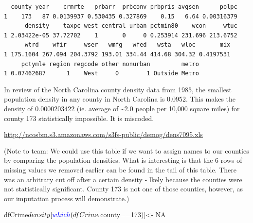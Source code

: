 \documentclass[]{article}
\newenvironment{Shaded}{}{}
\newcommand{\DecValTok}[1]{#1}
\newcommand{\KeywordTok}[1]{\textcolor[rgb]{0.00,0.00,1.00}{#1}}
\newcommand{\NormalTok}[1]{#1}
\newcommand{\OperatorTok}[1]{#1}
\newcommand{\OtherTok}[1]{\textcolor[rgb]{1.00,0.25,0.00}{#1}}
\newcommand{\StringTok}[1]{\textcolor[rgb]{0.00,0.50,0.50}{#1}}
\begin{document}
\begin{verbatim}
  county year    crmrte   prbarr  prbconv prbpris avgsen      polpc
1    173   87 0.0139937 0.530435 0.327869    0.15   6.64 0.00316379
      density    taxpc west central urban pctmin80    wcon     wtuc
1 2.03422e-05 37.72702    1       0     0 0.253914 231.696 213.6752
      wtrd    wfir     wser   wmfg   wfed   wsta   wloc       mix
1 175.1604 267.094 204.3792 193.01 334.44 414.68 304.32 0.4197531
     pctymle region regcode other nonurban         metro
1 0.07462687      1    West     0        1 Outside Metro
\end{verbatim}

In review of the North Carolina county density data from 1985, the
smallest population density in any county in North Carolina is 0.0952.
This makes the density of 0.0000203422 (ie. average of
\textasciitilde{}2.0 people per 10,000 square miles) for county 173
statistically impossible. It is miscoded.

\url{http://ncosbm.s3.amazonaws.com/s3fs-public/demog/dens7095.xls}

(Note to team: We could use this table if we want to assign names to our
counties by comparing the population densities. What is interesting is
that the 6 rows of missing values we removed earlier can be found in the
tail of this table. There was an arbitrary cut off after a certain
density - lkely because the counties were not statistically significant.
County 173 is not one of those counties, however, as our imputation
process will demonstrate.)

\begin{Shaded}
\begin{Highlighting}[]
\NormalTok{dfCrime}\OperatorTok{$}\NormalTok{density[}\KeywordTok{which}\NormalTok{(dfCrime}\OperatorTok{$}\NormalTok{county}\OperatorTok{==}\DecValTok{173}\NormalTok{)]<-}\StringTok{ }\OtherTok{NA}
\end{Highlighting}
\end{Shaded}
\end{document}
